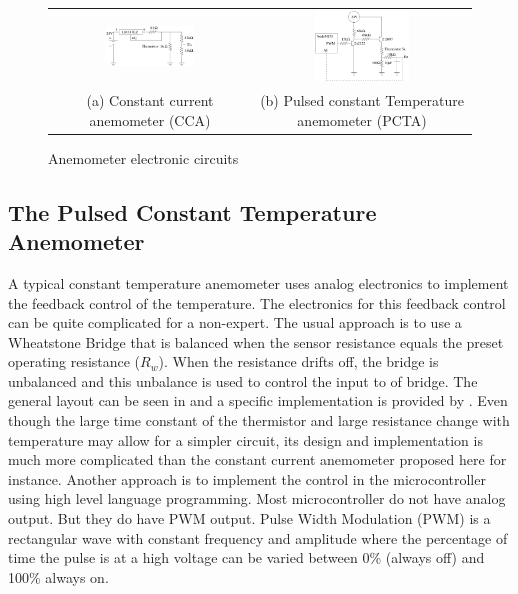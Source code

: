\documentclass[10pt,fleqn,a4paper,twoside]{article}
\begin{document}
\begin{figure}[h!]
  \centering
  \begin{tabular}{cc}
    \includegraphics[width=0.46\textwidth]{../../figures/cca.pdf} &
    \includegraphics[width=0.46\textwidth]{../../figures/cta.pdf} \\
    (a) Constant current anemometer (CCA) & (b) Pulsed constant Temperature anemometer (PCTA)\\
  \end{tabular}
  \vspace{0.5cm}
  \caption{Anemometer electronic circuits }
\label{fig:electronics}
\end{figure}



\subsection{The Pulsed Constant Temperature Anemometer}

A typical constant temperature anemometer uses analog electronics to implement the feedback control of the temperature. The electronics for this feedback control can be quite complicated for a non-expert. The usual approach is to use a Wheatstone Bridge that is balanced when the sensor resistance equals the preset operating resistance ($R_w$). When the resistance drifts off, the bridge is unbalanced and this unbalance is used to control the input to of bridge. The general layout can be seen in \citet{Lomas86} and a specific implementation is provided by \citet{Palma16}. Even though the large time constant of the thermistor and large resistance change with temperature may allow for a simpler circuit, its design and implementation is much more complicated than the constant current anemometer proposed here for instance. Another approach is to implement the control in the microcontroller using high level language programming. Most microcontroller do not have analog output. But they do have PWM output. Pulse Width Modulation (PWM) is a rectangular wave with constant frequency and amplitude where the percentage of time the pulse is at a high voltage can be varied between 0\% (always off) and 100\% always on.
\end{document}
